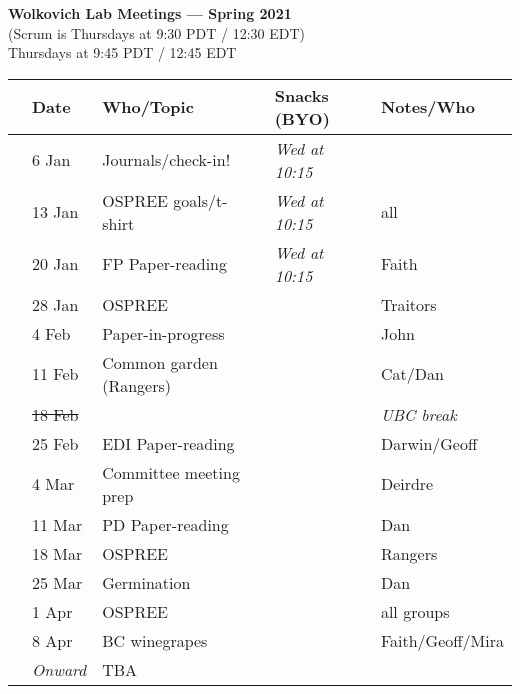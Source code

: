 \documentclass[11pt]{article}
\begin{document}
 
\raggedright
{}

\begin{center} 
{\large \textbf{Wolkovich Lab Meetings --- Spring 2021}} \\ [2pt]
(Scrum is Thursdays at 9:30 PDT / 12:30 EDT)\\
Thursdays at 9:45 PDT / 12:45 EDT \\
\end{center} 

\begin{center}
\begin{tabular}{ p{0.2 cm}  p{2 cm}  p{4.5 cm}  p{3 cm}  p{3.5 cm} }  \hline \hline
 & \textbf{Date}
   & \textbf{Who/Topic}
      & \textbf{Snacks (BYO)} 
         & \textbf{Notes/Who} \\ 
\hline \hline
 & 6 Jan & Journals/check-in! &       \emph{Wed at 10:15} & \\\hline
 & 13 Jan & OSPREE goals/t-shirt & \emph{Wed at 10:15}  & all \\\hline
 & 20 Jan & FP Paper-reading &     \emph{Wed at 10:15}  & Faith \\\hline  %
 & 28 Jan & OSPREE  &       &  Traitors \\\hline
 & 4 Feb & Paper-in-progress  &       & John \\\hline
 & 11 Feb & Common garden (Rangers) &       & Cat/Dan  \\\hline
 & \sout{18 Feb} &  &       &  \emph{UBC break} \\\hline
 & 25 Feb & EDI Paper-reading &       & Darwin/Geoff\\\hline
 & 4 Mar &  Committee meeting prep &       &  Deirdre \\\hline
 & 11 Mar &  PD Paper-reading &    & Dan\\\hline %
 & 18 Mar & OSPREE &       & Rangers \\\hline
 & 25 Mar & Germination &   &  Dan\\\hline
 & 1 Apr & OSPREE  &       &  all groups \\\hline
 & 8 Apr & BC winegrapes  &       & Faith/Geoff/Mira \\\hline
 & \emph{Onward} & TBA &    & \\\hline %

\hline
\end{tabular}
\end{center}
\end{document}
